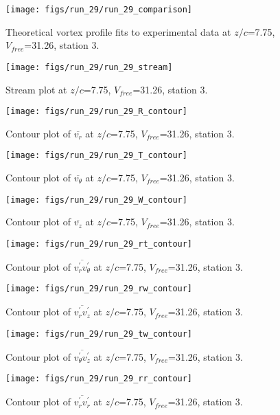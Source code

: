 \begin{figure}[H]
\centering
\texttt{[image: figs/run\_29/run\_29\_comparison]}
\caption{Theoretical vortex profile fits to experimental data at $z/c$=7.75, $V_{free}$=31.26, station 3.}
\end{figure}


\begin{figure}[H]
\centering
\texttt{[image: figs/run\_29/run\_29\_stream]}
\caption{Stream plot at $z/c$=7.75, $V_{free}$=31.26, station 3.}
\end{figure}


\begin{figure}[H]
\centering
\texttt{[image: figs/run\_29/run\_29\_R\_contour]}
\caption{Contour plot of $\overline{v_{r}}$ at $z/c$=7.75, $V_{free}$=31.26, station 3.}
\end{figure}


\begin{figure}[H]
\centering
\texttt{[image: figs/run\_29/run\_29\_T\_contour]}
\caption{Contour plot of $\overline{v_{\theta}}$ at $z/c$=7.75, $V_{free}$=31.26, station 3.}
\end{figure}


\begin{figure}[H]
\centering
\texttt{[image: figs/run\_29/run\_29\_W\_contour]}
\caption{Contour plot of $\overline{v_{z}}$ at $z/c$=7.75, $V_{free}$=31.26, station 3.}
\end{figure}


\begin{figure}[H]
\centering
\texttt{[image: figs/run\_29/run\_29\_rt\_contour]}
\caption{Contour plot of $\overline{v_{r}^{\prime} v_{\theta}^{\prime}}$ at $z/c$=7.75, $V_{free}$=31.26, station 3.}
\end{figure}


\begin{figure}[H]
\centering
\texttt{[image: figs/run\_29/run\_29\_rw\_contour]}
\caption{Contour plot of $\overline{v_{r}^{\prime} v_{z}^{\prime}}$ at $z/c$=7.75, $V_{free}$=31.26, station 3.}
\end{figure}


\begin{figure}[H]
\centering
\texttt{[image: figs/run\_29/run\_29\_tw\_contour]}
\caption{Contour plot of $\overline{v_{\theta}^{\prime} v_{z}^{\prime}}$ at $z/c$=7.75, $V_{free}$=31.26, station 3.}
\end{figure}


\begin{figure}[H]
\centering
\texttt{[image: figs/run\_29/run\_29\_rr\_contour]}
\caption{Contour plot of $\overline{v_{r}^{\prime} v_{r}^{\prime}}$ at $z/c$=7.75, $V_{free}$=31.26, station 3.}
\end{figure}


